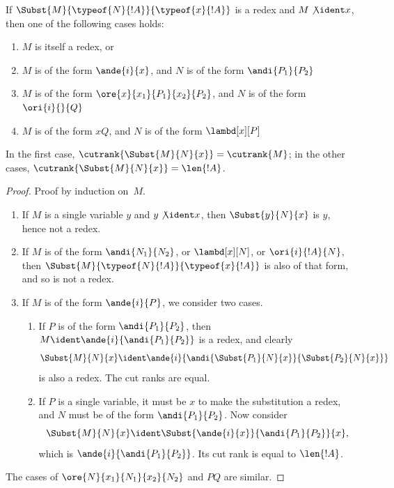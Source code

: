 \documentclass[../../../include/open-logic-section]{subfiles}
\begin{document}
\begin{lem}
  If $\Subst{M}{\typeof{N}{!A}}{\typeof{x}{!A}}$ is a redex and $M
  \not\ident x$, then one of the following cases holds:
  \begin{enumerate}
  \item $M$ is itself a redex, or
  \item $M$ is of the form $\ande{i}{x}$, and $N$ is of the form
    $\andi{P_1}{P_2}$
  \item $M$ is of the form $\ore{x}{x_1}{P_1}{x_2}{P_2}$, and $N$ is
    of the form $\ori{i}{}{Q}$
  \item $M$ is of the form $x Q$, and $N$ is of the form
    $\lambd[x][P]$
  \end{enumerate}
  In the first case, $\cutrank{\Subst{M}{N}{x}} = \cutrank{M}$; in the
  other cases, $\cutrank{\Subst{M}{N}{x}} = \len{!A}$.
\end{lem}
\begin{proof}
  Proof by induction on~$M$.
  \begin{enumerate}
  \item If $M$ is a single variable $y$ and $y \not\ident x$, then
    $\Subst{y}{N}{x}$ is $y$, hence not a redex.
  \item If $M$ is of the form $\andi{N_1}{N_2}$, or $\lambd[x][N]$, or
    $\ori{i}{!A}{N}$, then $\Subst{M}{\typeof{N}{!A}}{\typeof{x}{!A}}$ is
    also of that form, and so is not a redex.
  \item If $M$ is of the form $\ande{i}{P}$, we consider two cases.
    \begin{enumerate}
      \item If $P$ is of the form $\andi{P_1}{P_2}$, then $M \ident
        \ande{i}{\andi{P_1}{P_2}}$ is a redex, and clearly
        \[
        \Subst{M}{N}{x} \ident
        \ande{i}{\andi{\Subst{P_1}{N}{x}}{\Subst{P_2}{N}{x}}}
        \]
        is also a redex. The cut ranks are equal.
      \item If $P$ is a single variable, it must be $x$ to make the
        substitution a redex, and $N$ must be of the form
        $\andi{P_1}{P_2}$. Now consider
        \[
        \Subst{M}{N}{x} \ident \Subst{\ande{i}{x}}{\andi{P_1}{P_2}}{x},
        \]
        which is $\ande{i}{\andi{P_1}{P_2}}$. Its cut rank is equal to
        $\len{!A}$.
    \end{enumerate}
  \end{enumerate}
  The cases of $\ore{N}{x_1}{N_1}{x_2}{N_2}$ and $P Q$ are similar.
\end{proof}
\end{document}
